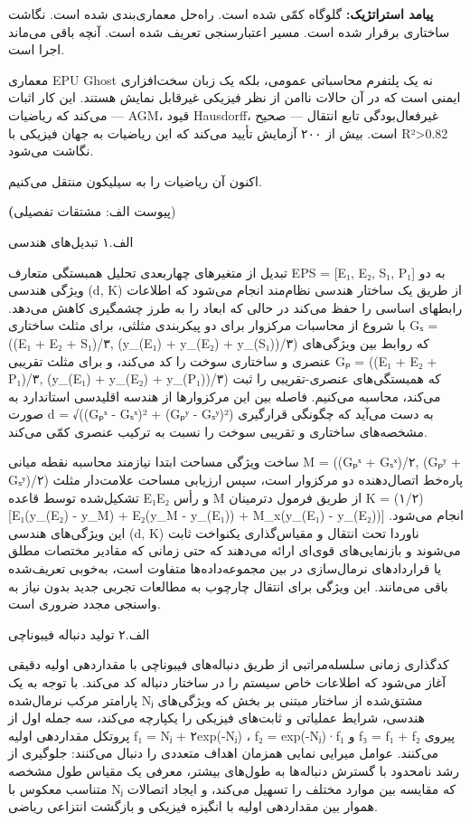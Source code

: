 \documentclass[12pt, a4paper]{article}
\begin{document}
\textbf{پیامد استراتژیک:} گلوگاه کمّی شده است. راه‌حل معماری‌بندی شده است. نگاشت ساختاری برقرار شده است. مسیر اعتبارسنجی تعریف شده است. آنچه باقی می‌ماند اجرا است.

معماری EPU Ghost نه یک پلتفرم محاسباتی عمومی، بلکه یک زبان سخت‌افزاری ایمنی است که در آن حالات ناامن از نظر فیزیکی غیرقابل نمایش هستند. این کار اثبات می‌کند که ریاضیات — AGM، قیود Hausdorff، غیرفعال‌بودگی تابع انتقال — صحیح است. بیش از ۲۰۰ آزمایش تأیید می‌کند که این ریاضیات به جهان فیزیکی با R²>0.82 نگاشت می‌شود.

اکنون آن ریاضیات را به سیلیکون منتقل می‌کنیم.


\textbf(پیوست الف: مشتقات تفصیلی)

الف.۱ تبدیل‌های هندسی

تبدیل از متغیرهای چهاربعدی تحلیل همبستگی متعارف EPS = [E₁, E₂, S₁, P₁] به دو ویژگی هندسی (d, K) از طریق یک ساختار هندسی نظام‌مند انجام می‌شود که اطلاعات رابطهای اساسی را حفظ می‌کند در حالی که ابعاد را به طرز چشمگیری کاهش می‌دهد. با شروع از محاسبات مرکزوار برای دو پیکربندی مثلثی، برای مثلث ساختاری Gₛ = ((E₁ + E₂ + S₁)/۳, (y\_(E₁) + y\_(E₂) + y\_(S₁))/۳) که روابط بین ویژگی‌های عنصری و ساختاری سوخت را کد می‌کند، و برای مثلث تقریبی Gₚ = ((E₁ + E₂ + P₁)/۳, (y\_(E₁) + y\_(E₂) + y\_(P₁))/۳) که همبستگی‌های عنصری-تقریبی را ثبت می‌کند، محاسبه می‌کنیم. فاصله بین این مرکزوارها از هندسه اقلیدسی استاندارد به صورت d = √((Gₚˣ - Gₛˣ)² + (Gₚʸ - Gₛʸ)²) به دست می‌آید که چگونگی قرارگیری مشخصه‌های ساختاری و تقریبی سوخت را نسبت به ترکیب عنصری کمّی می‌کند.

ساخت ویژگی مساحت ابتدا نیازمند محاسبه نقطه میانی M = ((Gₚˣ + Gₛˣ)/۲, (Gₚʸ + Gₛʸ)/۲) پاره‌خط اتصال‌دهنده دو مرکزوار است، سپس ارزیابی مساحت علامت‌دار مثلث تشکیل‌شده توسط قاعده E₁E₂ و رأس M از طریق فرمول دترمینان K = (۱/۲)[E₁(y\_(E₂) - y\_M) + E₂(y\_M - y\_(E₁)) + M\_x(y\_(E₁) - y\_(E₂))] انجام می‌شود. این ویژگی‌های هندسی (d, K) ناوردا تحت انتقال و مقیاس‌گذاری یکنواخت ثابت می‌شوند و بازنمایی‌های قوی‌ای ارائه می‌دهند که حتی زمانی که مقادیر مختصات مطلق یا قراردادهای نرمال‌سازی در بین مجموعه‌داده‌ها متفاوت است، به‌خوبی تعریف‌شده باقی می‌مانند. این ویژگی برای انتقال چارچوب به مطالعات تجربی جدید بدون نیاز به واسنجی مجدد ضروری است.

الف.۲ تولید دنباله فیبوناچی

کدگذاری زمانی سلسله‌مراتبی از طریق دنباله‌های فیبوناچی با مقداردهی اولیه دقیقی آغاز می‌شود که اطلاعات خاص سیستم را در ساختار دنباله کد می‌کند. با توجه به یک پارامتر مرکب نرمال‌شده Nⱼ مشتق‌شده از ساختار مبتنی بر بخش که ویژگی‌های هندسی، شرایط عملیاتی و ثابت‌های فیزیکی را یکپارچه می‌کند، سه جمله اول از پروتکل مقداردهی اولیه f₁ = Nⱼ + ۲exp(-Nⱼ) ، f₂ = exp(-Nⱼ)·f₁ و f₃ = f₁ + f₂ پیروی می‌کنند. عوامل میرایی نمایی همزمان اهداف متعددی را دنبال می‌کنند: جلوگیری از رشد نامحدود با گسترش دنباله‌ها به طول‌های بیشتر، معرفی یک مقیاس طول مشخصه متناسب معکوس با Nⱼ که مقایسه بین موارد مختلف را تسهیل می‌کند، و ایجاد اتصالات هموار بین مقداردهی اولیه با انگیزه فیزیکی و بازگشت انتزاعی ریاضی.
\end{document}
